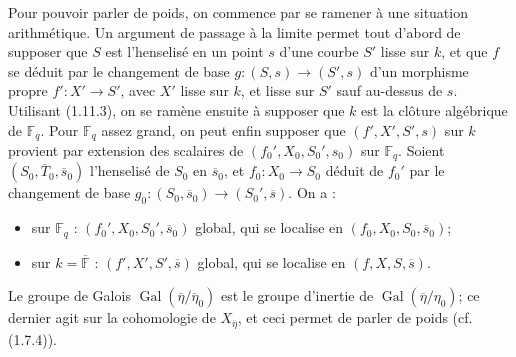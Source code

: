 \documentclass[12pt,a4paper]{article}
\theoremstyle{plain}
\theoremstyle{definition}
\theoremstyle{remark}
\DeclareMathOperator{\Gal}{Gal}
\newcommand{\FF}{{\mathbb{F}}}
\begin{document}
Pour pouvoir parler de poids, on commence par se ramener \`a une situation arithm\'etique. Un argument de passage \`a la limite permet tout d'abord de supposer que $S$ est l'henselis\'e en un point $s$ d'une courbe $S'$ lisse sur $k$, et que $f$ se d\'eduit par le changement de base $g : (S, s) \to (S', s)$ d'un morphisme propre $f' : X' \to S'$, avec $X'$ lisse sur $k$, et lisse sur $S'$ sauf au-dessus de $s$. Utilisant (1.11.3), on se ram\`ene ensuite \`a supposer que $k$ est la cl\^oture alg\'ebrique de $\FF_q$. Pour $\FF_q$ assez grand, on peut enfin supposer que $(f', X', S', s)$ sur $k$ provient par extension des scalaires de $(f_0', X_0, S_0', s_0)$ sur $\FF_q$. Soient $(S_0, \overline{T}_0, \overline{s}_0)$ l'henselis\'e de $S_0$ en $\overline{s}_0$, et $f_0 : X_0 \to S_0$ d\'eduit de $f_0'$ par le changement de base $g_0 : (S_0, \overline{s}_0) \to (S_0', \overline{s})$. On a :
\begin{itemize}
\item sur $\FF_q$ : $(f_0', X_0, S_0', \overline{s}_0)$ global, qui se localise en $(f_0, X_0, S_0, \overline{s}_0)$;
\item sur $k = \overline{\FF}$ : $(f', X', S', \overline{s})$ global, qui se localise en $(f, X, S, \overline{s})$.
\end{itemize}

Le groupe de Galois $\Gal(\overline{\eta}/\overline{\eta}_0)$ est le groupe d'inertie de $\Gal(\overline{\eta}/\eta_0)$; ce dernier agit sur la cohomologie de $X_{\overline{\eta}}$, et ceci permet de parler de poids (cf. (1.7.4)).
\end{document}
